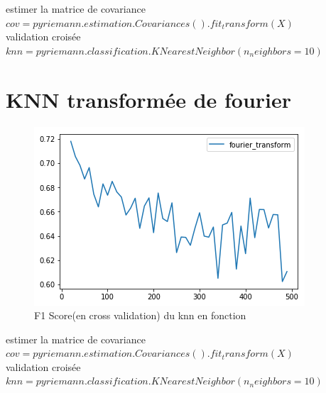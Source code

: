 \documentclass{article}
\begin{document}
estimer la matrice de covariance\\
$
cov = pyriemann.estimation.Covariances().fit_transform(X)
$
\\
validation croisée\\
$
knn = pyriemann.classification.KNearestNeighbor(n_neighbors=10)
$
\section{KNN transformée de fourier }
\begin{figure}[H]
\begin{center}
\includegraphics[scale=1]{images/knn_tf_f1Score.png}
\end{center}
\caption{F1 Score(en cross validation) du knn en fonction}
\end{figure}

estimer la matrice de covariance\\
$
cov = pyriemann.estimation.Covariances().fit_transform(X)
$
\\
validation croisée\\
$
knn = pyriemann.classification.KNearestNeighbor(n_neighbors=10)
$
\end{document}
